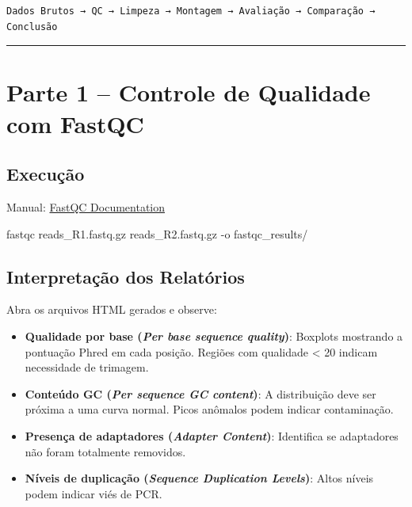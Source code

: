 \documentclass[
  brazilian,
  letterpaper,
  DIV=11,
  numbers=noendperiod]{scrartcl}
\newenvironment{Shaded}{\begin{snugshade}}{\end{snugshade}}
\newcommand{\AttributeTok}[1]{\textcolor[rgb]{0.40,0.45,0.13}{#1}}
\newcommand{\ExtensionTok}[1]{\textcolor[rgb]{0.00,0.23,0.31}{#1}}
\newcommand{\NormalTok}[1]{\textcolor[rgb]{0.00,0.23,0.31}{#1}}
\providecommand{\tightlist}{%
  \setlength{\itemsep}{0pt}\setlength{\parskip}{0pt}}
\begin{document}
\begin{verbatim}
Dados Brutos → QC → Limpeza → Montagem → Avaliação → Comparação → Conclusão
\end{verbatim}

\begin{center}\rule{0.5\linewidth}{0.5pt}\end{center}

\section{Parte 1 -- Controle de Qualidade com
FastQC}\label{parte-1-controle-de-qualidade-com-fastqc}

\subsection{Execução}\label{execuuxe7uxe3o}

Manual:
\href{https://www.bioinformatics.babraham.ac.uk/projects/fastqc/}{FastQC
Documentation}

\begin{Shaded}
\begin{Highlighting}[]
\ExtensionTok{fastqc}\NormalTok{ reads\_R1.fastq.gz reads\_R2.fastq.gz }\AttributeTok{{-}o}\NormalTok{ fastqc\_results/}
\end{Highlighting}
\end{Shaded}

\subsection{Interpretação dos
Relatórios}\label{interpretauxe7uxe3o-dos-relatuxf3rios}

Abra os arquivos HTML gerados e observe:

\begin{itemize}
\tightlist
\item
  \textbf{Qualidade por base (\emph{Per base sequence quality})}:
  Boxplots mostrando a pontuação Phred em cada posição. Regiões com
  qualidade \textless{} 20 indicam necessidade de trimagem.
\item
  \textbf{Conteúdo GC (\emph{Per sequence GC content})}: A distribuição
  deve ser próxima a uma curva normal. Picos anômalos podem indicar
  contaminação.
\item
  \textbf{Presença de adaptadores (\emph{Adapter Content})}: Identifica
  se adaptadores não foram totalmente removidos.
\item
  \textbf{Níveis de duplicação (\emph{Sequence Duplication Levels})}:
  Altos níveis podem indicar viés de PCR.
\end{itemize}
\end{document}
